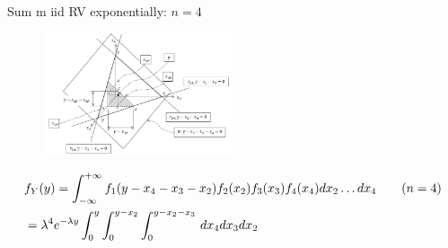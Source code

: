 \documentclass[asd-beamer.tex]{subfiles}%
\begin{document}
\begin{wordonframe}{Sum m iid RV exponentially: $n=4$}
	\begin{figure}[!ht]\includegraphics[trim={0cm 0cm 0 0},clip, keepaspectratio,width=0.5\textwidth]{figures/internet/sumRV-integration}\label{fig:sumRV-integration}
	\end{figure}
	\begin{align*}
	&f_Y(y)=\int_{-\infty}^{+\infty}{}f_1(y-x_4-x_3-x_2)f_2(x_2)f_3(x_3)f_4(x_4)dx_2\ldots dx_4\tag{$n=4$}\\
	&=\lambda^4e^{-\lambda y}\int_0^y\int_0^{y-x_2}\int_0^{y-x_2-x_3}\,dx_4dx_3dx_2\\
	\end{align*}
\end{wordonframe}
\end{document}

